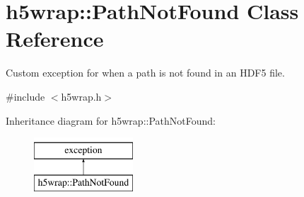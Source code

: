 \hypertarget{classh5wrap_1_1_path_not_found}{\section{h5wrap\-:\-:Path\-Not\-Found Class Reference}
\label{classh5wrap_1_1_path_not_found}
}


Custom exception for when a path is not found in an H\-D\-F5 file.  




{\ttfamily \#include $<$h5wrap.\-h$>$}

Inheritance diagram for h5wrap\-:\-:Path\-Not\-Found\-:\begin{figure}[H]
\begin{center}
\leavevmode
\includegraphics[height=2.000000cm]{classh5wrap_1_1_path_not_found}
\end{center}
\end{figure}
